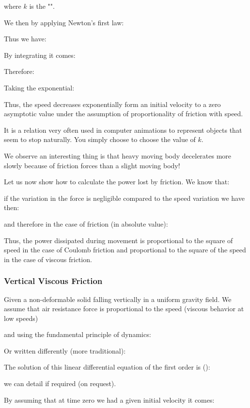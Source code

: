 	where $k$ is the "".

	We then by applying Newton's first law:
	
	Thus we have:
	
	By integrating it comes:
	
	Therefore:
	
	Taking the exponential:
	
	Thus, the speed decreases exponentially form an initial velocity to a zero asymptotic value under the assumption of proportionality of friction with speed.

	It is a relation very often used in computer animations to represent objects that seem to stop naturally. You simply choose to choose the value of $k$.

	We observe an interesting thing is that heavy moving body decelerates more slowly because of friction forces than a slight moving body!

	Let us now show how to calculate the power lost by friction. We know that:
	
	if the variation in the force is negligible compared to the speed variation we have then:
	
	and therefore in the case of friction (in absolute value):
	
	Thus, the power dissipated during movement is proportional to the square of speed in the case of Coulomb friction and proportional to the square of the speed in the case of viscous friction.
	
	\subsubsection{Vertical Viscous Friction}
	Given a non-deformable solid falling vertically in a uniform gravity field. We assume that air resistance force is proportional to the speed (viscous behavior at low speeds)
	
	and using the fundamental principle of dynamics:
	
	Or written differently (more traditional):
	
	The solution of this linear differential equation of the first order is ():
	
	we can detail if required (on request).

	By assuming that at time zero we had a given initial velocity it comes:
	
